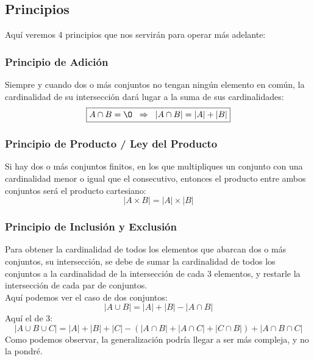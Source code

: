 \subsection{Principios}
 Aquí veremos 4 principios que nos servirán para operar más adelante:
\subsubsection{Principio de Adición}
 Siempre y cuando dos  o más conjuntos no tengan ningún elemento en común, la cardinalidad de su intersección dará lugar a la suma de sus cardinalidades:
\[
        \boxed{A \cap B = \O  \hspace{2mm}\Rightarrow\hspace{2mm} \left | A \cap B \right | = \left | A \right | + \left | B \right |}
\]
\subsubsection{Principio de Producto / Ley del Producto}
 Si hay dos o más conjuntos finitos, en los que multipliques un conjunto con una cardinalidad menor o igual que el consecutivo, entonces el producto entre ambos conjuntos será el producto cartesiano:
\[
        \boxed{\left | A \times B \right | = \left | A  \right | \times \left | B  \right |}
\]
\subsubsection{Principio de Inclusión y Exclusión}
 Para obtener la cardinalidad de todos los elementos que abarcan dos o más conjuntos, su intersección, se debe de sumar la cardinalidad de todos los conjuntos a la cardinalidad de la intersección de cada 3 elementos, y restarle la intersección de cada par de conjuntos.
\\Aquí podemos ver el caso de dos conjuntos:
\[
        \boxed{\left | A \cup B \right | = \left | A \right | + \left | B \right | - \left | A \cap B \right |}
\]
 Aquí el de 3:
\[
        \boxed{\left | A \cup B \cup C \right | = \left | A \right | + \left | B \right |+ \left | C \right |-( \left | A \cap B \right | + \left | A \cap C \right | + \left | C \cap B \right |) + \left | A \cap B \cap C\right |}
\]
 Como podemos observar, la generalización podría llegar a ser más compleja, y no la pondré.
